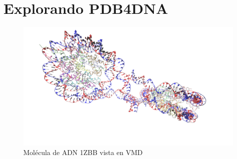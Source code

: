 
\clearpage

\section{Explorando PDB4DNA}
\label{sec:MODIFI}
\begin{figure}[htbp]
    \centering
    \includegraphics[width=0.8\linewidth]{./Figures/1ZBB.png}
    \caption[Molécula de ADN 1ZBB]{Molécula de ADN 1ZBB vista en VMD}
    \label{fig:1zbb}
\end{figure}


